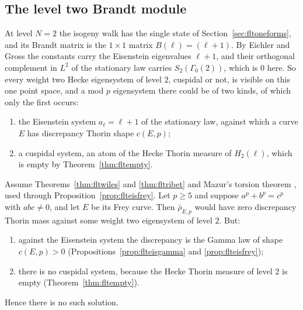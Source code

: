 \subsection{The level two Brandt module}

At level $N=2$ the isogeny walk has the single state of Section~\ref{sec:fltoneforms}, and its Brandt matrix is the $1\times1$ matrix $B(\ell)=(\ell+1)$. By Eichler and Gross \cite{eichler1954,eichler1973,gross1987} the constants carry the Eisenstein eigenvalues $\ell+1$, and their orthogonal complement in $L^2$ of the stationary law carries $S_2(\Gamma_0(2))$, which is $0$ here. So every weight two Hecke eigensystem of level $2$, cuspidal or not, is visible on this one point space, and a mod $p$ eigensystem there could be of two kinds, of which only the first occurs:
\begin{enumerate}
\item[(E)] the Eisenstein system $a_\ell=\ell+1$ of the stationary law, against which a curve $E$ has discrepancy Thorin shape $c(E,p)$;
\item[(C)] a cuspidal system, an atom of the Hecke Thorin measure of $H_2(\ell)$, which is empty by Theorem~\ref{thm:fltempty}.
\end{enumerate}

\begin{theorem}\label{thm:flttwo}
Assume Theorems~\ref{thm:fltwiles} and \ref{thm:fltribet} and Mazur's torsion theorem \cite{mazur1977}, used through Proposition~\ref{prop:flteisfrey}. Let $p\ge5$ and suppose $a^p+b^p=c^p$ with $abc\ne0$, and let $E$ be its Frey curve. Then $\bar\rho_{E,p}$ would have zero discrepancy Thorin mass against some weight two eigensystem of level $2$. But:
\begin{enumerate}
\item[(i)] against the Eisenstein system the discrepancy is the Gamma law of shape $c(E,p)>0$ (Propositions~\ref{prop:flteisgamma} and \ref{prop:flteisfrey});
\item[(ii)] there is no cuspidal system, because the Hecke Thorin measure of level $2$ is empty (Theorem~\ref{thm:fltempty}).
\end{enumerate}
Hence there is no such solution.
\end{theorem}


